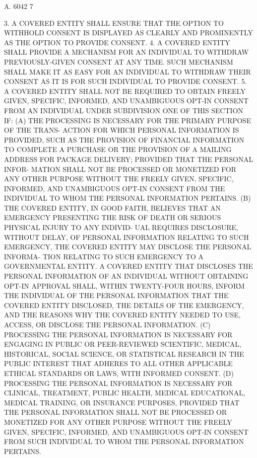  A. 6042                             7
 
   3.  A  COVERED ENTITY SHALL ENSURE THAT THE OPTION TO WITHHOLD CONSENT
 IS DISPLAYED AS  CLEARLY  AND  PROMINENTLY  AS  THE  OPTION  TO  PROVIDE
 CONSENT.
   4.  A  COVERED  ENTITY  SHALL PROVIDE A MECHANISM FOR AN INDIVIDUAL TO
 WITHDRAW PREVIOUSLY-GIVEN CONSENT AT ANY TIME. SUCH MECHANISM SHALL MAKE
 IT AS EASY FOR AN INDIVIDUAL TO WITHDRAW THEIR CONSENT AS IT IS FOR SUCH
 INDIVIDUAL TO PROVIDE CONSENT.
   5. A COVERED ENTITY SHALL NOT BE  REQUIRED  TO  OBTAIN  FREELY  GIVEN,
 SPECIFIC,  INFORMED,  AND  UNAMBIGUOUS OPT-IN CONSENT FROM AN INDIVIDUAL
 UNDER SUBDIVISION ONE OF THIS SECTION IF:
   (A) THE PROCESSING IS NECESSARY FOR THE PRIMARY PURPOSE OF THE  TRANS-
 ACTION FOR WHICH PERSONAL INFORMATION IS PROVIDED, SUCH AS THE PROVISION
 OF  FINANCIAL  INFORMATION  TO COMPLETE A PURCHASE OR THE PROVISION OF A
 MAILING ADDRESS FOR PACKAGE DELIVERY; PROVIDED THAT THE PERSONAL  INFOR-
 MATION SHALL NOT BE PROCESSED OR MONETIZED FOR ANY OTHER PURPOSE WITHOUT
 THE  FREELY  GIVEN,  SPECIFIC,  INFORMED, AND UNAMBIGUOUS OPT-IN CONSENT
 FROM THE INDIVIDUAL TO WHOM THE PERSONAL INFORMATION PERTAINS.
   (B) THE COVERED ENTITY, IN GOOD  FAITH,  BELIEVES  THAT  AN  EMERGENCY
 PRESENTING  THE RISK OF DEATH OR SERIOUS PHYSICAL INJURY TO ANY INDIVID-
 UAL REQUIRES DISCLOSURE, WITHOUT DELAY, OF PERSONAL INFORMATION RELATING
 TO SUCH EMERGENCY, THE COVERED ENTITY MAY DISCLOSE THE PERSONAL INFORMA-
 TION RELATING TO SUCH EMERGENCY TO  A  GOVERNMENTAL  ENTITY.  A  COVERED
 ENTITY  THAT DISCLOSES THE PERSONAL INFORMATION OF AN INDIVIDUAL WITHOUT
 OBTAINING OPT-IN APPROVAL SHALL, WITHIN TWENTY-FOUR  HOURS,  INFORM  THE
 INDIVIDUAL   OF   THE  PERSONAL  INFORMATION  THAT  THE  COVERED  ENTITY
 DISCLOSED, THE DETAILS OF THE EMERGENCY, AND THE REASONS WHY THE COVERED
 ENTITY NEEDED TO USE, ACCESS, OR DISCLOSE THE PERSONAL INFORMATION.
   (C) PROCESSING THE PERSONAL INFORMATION IS NECESSARY FOR  ENGAGING  IN
 PUBLIC OR PEER-REVIEWED SCIENTIFIC, MEDICAL, HISTORICAL, SOCIAL SCIENCE,
 OR STATISTICAL RESEARCH IN THE PUBLIC INTEREST THAT ADHERES TO ALL OTHER
 APPLICABLE ETHICAL STANDARDS OR LAWS, WITH INFORMED CONSENT.
   (D)  PROCESSING  THE  PERSONAL  INFORMATION IS NECESSARY FOR CLINICAL,
 TREATMENT, PUBLIC HEALTH,  MEDICAL  EDUCATIONAL,  MEDICAL  TRAINING,  OR
 INSURANCE  PURPOSES, PROVIDED THAT THE PERSONAL INFORMATION SHALL NOT BE
 PROCESSED OR MONETIZED FOR ANY OTHER PURPOSE WITHOUT THE  FREELY  GIVEN,
 SPECIFIC,  INFORMED, AND UNAMBIGUOUS OPT-IN CONSENT FROM SUCH INDIVIDUAL
 TO WHOM THE PERSONAL INFORMATION PERTAINS.
